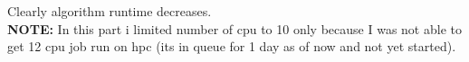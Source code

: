 \documentclass{article}
\begin{document}
\begin{enumerate}
    Clearly algorithm runtime decreases.\\

    \textbf{NOTE: }In this part i limited number of cpu to 10 only because I was not able to get 12 cpu job run on hpc (its in queue for 1 day as of now and not yet started).

\end{enumerate}
\end{document}
